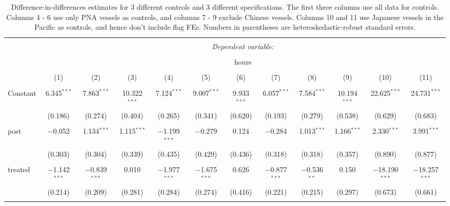 \documentclass[11pt,]{article}
\begin{document}
\clearpage
\begin{landscape}


\begin{table}[!htbp] \centering 
  \caption{\label{tab:did}Difference-in-differences estimates for 3 different controls and 3 different specifications. The first three columns use all data for controls. Columns 4 - 6 use only PNA vessels as controls, and columns 7 - 9 exclude Chinese vessels. Columns 10 and 11 use Japanese vessels in the Pacific as controls, and hence don't include flag FEs. Numbers in parentheses are heteroskedastic-robust standard errors.} 
  \label{} 
\footnotesize 
\begin{tabular}{@{\extracolsep{1pt}}lccccccccccc} 
\\[-1.8ex]\hline 
\hline \\[-1.8ex] 
 & \multicolumn{11}{c}{\textit{Dependent variable:}} \\ 
\cline{2-12} 
\\[-1.8ex] & \multicolumn{11}{c}{hours} \\ 
\\[-1.8ex] & (1) & (2) & (3) & (4) & (5) & (6) & (7) & (8) & (9) & (10) & (11)\\ 
\hline \\[-1.8ex] 
 Constant & 6.345$^{***}$ & 7.863$^{***}$ & 10.322$^{***}$ & 7.124$^{***}$ & 9.007$^{***}$ & 9.933$^{***}$ & 6.057$^{***}$ & 7.584$^{***}$ & 10.194$^{***}$ & 22.625$^{***}$ & 24.731$^{***}$ \\ 
  & (0.186) & (0.274) & (0.404) & (0.265) & (0.341) & (0.620) & (0.193) & (0.279) & (0.538) & (0.629) & (0.683) \\ 
  & & & & & & & & & & & \\ 
 post & $-$0.052 & 1.134$^{***}$ & 1.115$^{***}$ & $-$1.199$^{***}$ & $-$0.279 & 0.124 & $-$0.284 & 1.013$^{***}$ & 1.166$^{***}$ & 2.330$^{***}$ & 3.991$^{***}$ \\ 
  & (0.303) & (0.304) & (0.339) & (0.435) & (0.429) & (0.436) & (0.318) & (0.318) & (0.357) & (0.890) & (0.877) \\ 
  & & & & & & & & & & & \\ 
 treated & $-$1.142$^{***}$ & $-$0.839$^{***}$ & 0.010 & $-$1.977$^{***}$ & $-$1.675$^{***}$ & 0.626 & $-$0.877$^{***}$ & $-$0.536$^{**}$ & 0.150 & $-$18.190$^{***}$ & $-$18.257$^{***}$ \\ 
  & (0.214) & (0.209) & (0.281) & (0.284) & (0.274) & (0.416) & (0.221) & (0.215) & (0.297) & (0.673) & (0.661) \\ 
  & & & & & & & & & & & \\ 

\end{tabular}
\end{table}
\end{landscape}
\end{document}
